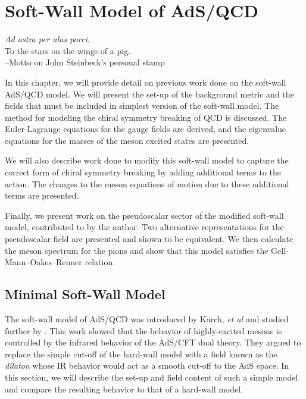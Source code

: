 \chapter{Soft-Wall Model of AdS/QCD
\label{sec:Soft-Wall-Model}}
\begin{flushright}
\emph{Ad astra per alas porci}. \\
To the stars on the wings of a pig. \\
--Motto on John Steinbeck's personal stamp
\end{flushright}

In this chapter, we will provide detail on previous work done on the soft-wall AdS/QCD model.
We will present the set-up of the background metric and the fields that must be included in simplest version of the soft-wall model.
The method for modeling the chiral symmetry breaking of QCD is discussed.
The Euler-Lagrange equations for the gauge fields are derived, and the eigenvalue equations for the masses of the meson excited states are presented.

We will also describe work done to modify this soft-wall model to capture the correct form of chiral symmetry breaking by adding additional terms to the action.
The changes to the meson equations of motion due to these additional terms are presented.

Finally, we present work on the pseudoscalar sector of the modified soft-wall model, contributed to by the author. 
Two alternative representations for the pseudoscalar field are presented and shown to be equivalent.
We then calculate the meson spectrum for the pions and show that this model satisfies the Gell-Mann--Oakes--Renner relation.

\section{Minimal Soft-Wall Model}
The soft-wall model of AdS/QCD was introduced by Karch, \emph{et al} \cite{karch-katz-son-adsqcd} and studied further by \cite{karch-dilaton-sign,Evans:2006ea,Grigoryan:2007my,kwee-lebed-pion,Cherman2009,colangelo2008,Huang:2007fv}.
This work showed that the behavior of highly-excited mesons is controlled by the infrared behavior of the AdS/CFT dual theory. 
They argued to replace the simple cut-off of the hard-wall model with a field known as the \emph{dilaton} whose IR behavior would act as a smooth cut-off to the AdS space.
In this section, we will describe the set-up and field content of such a simple model and compare the resulting behavior to that of a hard-wall model.

